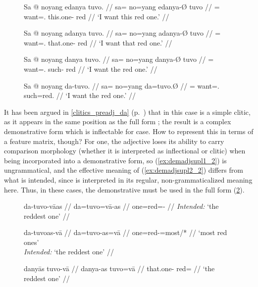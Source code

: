 \begin{figure}
\pex
\a\ljudge\ques\begingl
	\gla Sa @ noyang edanya tuvo. //
	\glb sa= no=yang edanya-Ø tuvo //
	\glc \PatT{}= want=\Fsg{}.\Aarg{} this.one-\Top{} red //
	\glft `I want this red one.' //
\endgl

\a\ljudge\ques\begingl
	\gla Sa @ noyang adanya tuvo. //
	\glb sa= no=yang adanya-Ø tuvo //
	\glc \PatT{}= want=\Fsg{}.\Aarg{} that.one-\Top{} red //
	\glft `I want that red one.' //
\endgl

\a\label{ex:danyatop2}\begingl
	\gla Sa @ noyang danya tuvo. //
	\glb sa= no=yang danya-Ø tuvo //
	\glc \PatT{}= want=\Fsg{}.\Aarg{} such-\Top{} red //
	\glft `I want the red one.' //
\endgl

\a\label{ex:redone2}\begingl
	\gla Sa @ noyang da-tuvo. //
	\glb sa= no=yang da=tuvo.Ø //
	\glc \PatT{}= want=\Fsg{}.\Aarg{} such=red.\Top{} //
	\glft `I want the red one.' //
\endgl

\xe
\end{figure}

It has been argued in \autoref{clitics_preadj_da} (p.~\pageref{clitics_preadj_da}) that  in this
case is a simple clitic, as it appears in the same position as the full form
; the result is a complex demonstrative form which is
inflectable for case. How to represent this in terms of a feature matrix,
though? For one, the adjective loses its ability to carry comparison morphology
(whether it is interpreted as inflectional or clitic) when being incorporated
into a demonstrative form, so (\ref{ex:demadjsupl1_2}) is ungrammatical, and
the effective meaning of (\ref{ex:demadjsupl2_2}) differs from what is
intended, since  is interpreted in its regular,
non-grammaticalized meaning here. Thus, in these cases, the demonstrative must
be used in the full form (\ref{ex:demfreeadjsupl}).

\begin{figure}
\pex
\a\label{ex:demadjsupl1_2}\ljudge*\begingl
	\gla da-tuvo-vāas //
	\glb da=tuvo=vā-as //
	\glc one=red=\Supl{}-\Parg{} //
	\glft \textit{Intended:} `the reddest one' //
\endgl

\a\label{ex:demadjsupl2_2}\ljudge\excl\begingl
	\gla da-tuvoas-vā //
	\glb da=tuvo-as=vā //
	\glc one=red-\Parg{}=most/*\Supl{} //
	\glft `most red ones' \\
		\textit{Intended:} `the reddest one' //
\endgl

\a\label{ex:demfreeadjsupl}\begingl
	\gla danyās tuvo-vā //
	\glb danya-as tuvo=vā //
	\glc that.one-\Parg{} red=\Supl{} //
	\glft `the reddest one' //
\endgl
\xe
\end{figure}

